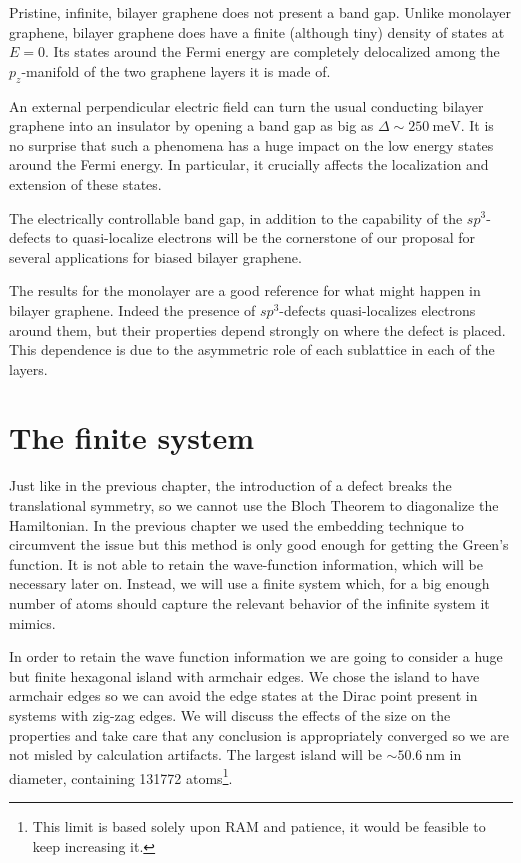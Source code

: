 Pristine, infinite, bilayer graphene does not present a band gap. Unlike monolayer graphene, bilayer graphene does have a finite (although tiny) density of states at $E=0$. Its states around the Fermi energy are completely delocalized among the $p_z$-manifold of the two graphene layers it is made of.

An external perpendicular electric field can turn the usual conducting bilayer graphene into an insulator by opening a band gap as big as\cite{McCann2006, Castro2007, Oostinga2007, Zhang2009, Taychatanapat2010, Castro2010a, Ponomarenko2011, Allen2012, Sui2015} $\Delta\sim\SI{250}{\meV}$.
It is no surprise that such a phenomena has a huge impact on the low energy states around the Fermi energy. In particular, it crucially affects the localization and extension of these states.

The electrically controllable band gap, in addition to the capability of the $sp^3$-defects to quasi-localize electrons will be the cornerstone of our proposal for several applications for biased bilayer graphene.
\medskip



The results for the monolayer are a good reference for what might happen in bilayer graphene. Indeed the presence of $sp^3$-defects quasi-localizes electrons around them, but their properties depend strongly on where the defect is placed. This dependence is due to the asymmetric role of each sublattice in each of the layers.


\section{The finite system}
Just like in the previous chapter, the introduction of a defect breaks the translational symmetry, so we cannot use the Bloch Theorem to diagonalize the Hamiltonian. In the previous chapter we used the embedding technique to circumvent the issue but this method is only good enough for getting the Green's function. It is not able to retain the wave-function information, which will be necessary later on.
Instead, we will use a finite system which, for a big enough number of atoms should capture the relevant behavior of the infinite system it mimics.
\medskip


In order to retain the wave function information we are going to consider a huge but finite hexagonal island with armchair edges. We chose the island to have armchair edges so we can avoid the edge states at the Dirac point present in systems with zig-zag edges.\cite{Nakada1996}
We will discuss the effects of the size on the properties and take care that any conclusion is appropriately converged so we are not misled by calculation artifacts. The largest island will be $\sim\SI{50.6}{\nm}$ in diameter, containing 131772 atoms\footnote{This limit is based solely upon RAM and patience, it would be feasible to keep increasing it.}.  %


